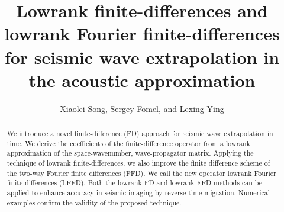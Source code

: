 \renewcommand{\thefootnote}{\fnsymbol{footnote}}


\title{Lowrank finite-differences and lowrank Fourier finite-differences for seismic wave extrapolation 
in the acoustic approximation}

\author{Xiaolei Song\footnotemark[1], Sergey Fomel\footnotemark[1], and Lexing Ying\footnotemark[2]}

\address{\footnotemark[1]Bureau of Economic Geology, 
John A. and Katherine G. Jackson School of Geosciences, \\
The University of Texas at Austin \\
University Station, Box X \\
Austin, TX 78713-8924 \\
USA \\
sergey.fomel@beg.utexas.edu \\ 
\footnotemark[2]Department of Mathematics \\
The University of Texas at Austin \\
1 University Station \\
Austin, TX 78712 \\
USA \\
lexing@math.utexas.edu
}



\label{firstpage}


\maketitle

\begin{abstract}
  We introduce a novel finite-difference (FD) approach for seismic wave extrapolation in time.  
  We derive the coefficients of the finite-difference operator from 
  a lowrank approximation of the space-wavenumber, wave-propagator matrix. 
  Applying the technique of lowrank finite-differences, 
  we also improve the finite difference scheme of the two-way Fourier finite differences (FFD).
  We call the new operator lowrank Fourier finite differences (LFFD). 
   Both the lowrank FD and lowrank FFD methods can be applied to enhance accuracy in seismic imaging by reverse-time migration.
  Numerical examples confirm the validity of the proposed technique.
\end{abstract}


